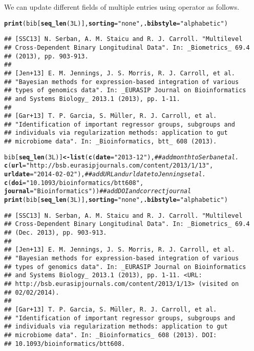 \documentclass[article]{jss}\usepackage[]{graphicx}\usepackage[]{color}
\makeatletter
\newcommand{\hlnum}[1]{\textcolor[rgb]{0.125,0.125,1}{#1}}%
\newcommand{\hlstr}[1]{\textcolor[rgb]{0.125,0.125,1}{#1}}%
\newcommand{\hlcom}[1]{\textcolor[rgb]{1,0,0.753}{\textit{#1}}}%
\newcommand{\hlstd}[1]{\textcolor[rgb]{0.251,0.251,0.282}{#1}}%
\newcommand{\hlkwb}[1]{\textcolor[rgb]{0.439,0.251,1}{\textbf{#1}}}%
\newcommand{\hlkwc}[1]{\textcolor[rgb]{0.529,0,0.184}{\textbf{#1}}}%
\newcommand{\hlkwd}[1]{\textcolor[rgb]{0.251,0.251,0.282}{\textbf{#1}}}%
\newenvironment{kframe}{%
 \def\at@end@of@kframe{}%
 \ifinner\ifhmode%
  \def\at@end@of@kframe{\end{minipage}}%
  \begin{minipage}{\columnwidth}%
 \fi\fi%
 \def\FrameCommand##1{\hskip\@totalleftmargin \hskip-\fboxsep
 \colorbox{shadecolor}{##1}\hskip-\fboxsep
     \hskip-\linewidth \hskip-\@totalleftmargin \hskip\columnwidth}%
 \MakeFramed {\advance\hsize-\width
   \@totalleftmargin\z@ \linewidth\hsize
   \@setminipage}}%
 {\par\unskip\endMakeFramed%
 \at@end@of@kframe}
\newenvironment{knitrout}{}{} %
\makeatother
\begin{document}
We can update different fields of multiple entries using operator \code{[<-} as follows.
\begin{knitrout}
\color{fgcolor}\begin{kframe}
\begin{alltt}
\hlkwd{print}\hlstd{(bib[}\hlkwd{seq_len}\hlstd{(}\hlnum{3L}\hlstd{)],} \hlkwc{sorting} \hlstd{=} \hlstr{"none"}\hlstd{,} \hlkwc{.bibstyle} \hlstd{=} \hlstr{"alphabetic"}\hlstd{)}
\end{alltt}
\begin{verbatim}
## [SSC13] N. Serban, A. M. Staicu and R. J. Carroll. "Multilevel
## Cross-Dependent Binary Longitudinal Data". In: _Biometrics_ 69.4
## (2013), pp. 903-913.
## 
## [Jen+13] E. M. Jennings, J. S. Morris, R. J. Carroll, et al.
## "Bayesian methods for expression-based integration of various
## types of genomics data". In: _EURASIP Journal on Bioinformatics
## and Systems Biology_ 2013.1 (2013), pp. 1-11.
## 
## [Gar+13] T. P. Garcia, S. Müller, R. J. Carroll, et al.
## "Identification of important regressor groups, subgroups and
## individuals via regularization methods: application to gut
## microbiome data". In: _Bioinformatics, btt_ 608 (2013).
\end{verbatim}
\begin{alltt}
\hlstd{bib[}\hlkwd{seq_len}\hlstd{(}\hlnum{3L}\hlstd{)]} \hlkwb{<-} \hlkwd{list}\hlstd{(}\hlkwd{c}\hlstd{(}\hlkwc{date}\hlstd{=}\hlstr{"2013-12"}\hlstd{),} \hlcom{## add month to Serban et al.}
        \hlkwd{c}\hlstd{(}\hlkwc{url}\hlstd{=}\hlstr{"http://bsb.eurasipjournals.com/content/2013/1/13"}\hlstd{,}
          \hlkwc{urldate} \hlstd{=} \hlstr{"2014-02-02"}\hlstd{),} \hlcom{## add URL and urldate to Jennings et al.}
        \hlkwd{c}\hlstd{(}\hlkwc{doi}\hlstd{=}\hlstr{"10.1093/bioinformatics/btt608"}\hlstd{,}
          \hlkwc{journal} \hlstd{=} \hlstr{"Bioinformatics"}\hlstd{))} \hlcom{## add DOI and correct journal}
\hlkwd{print}\hlstd{(bib[}\hlkwd{seq_len}\hlstd{(}\hlnum{3L}\hlstd{)],} \hlkwc{sorting} \hlstd{=} \hlstr{"none"}\hlstd{,} \hlkwc{.bibstyle} \hlstd{=} \hlstr{"alphabetic"}\hlstd{)}
\end{alltt}
\begin{verbatim}
## [SSC13] N. Serban, A. M. Staicu and R. J. Carroll. "Multilevel
## Cross-Dependent Binary Longitudinal Data". In: _Biometrics_ 69.4
## (Dec. 2013), pp. 903-913.
## 
## [Jen+13] E. M. Jennings, J. S. Morris, R. J. Carroll, et al.
## "Bayesian methods for expression-based integration of various
## types of genomics data". In: _EURASIP Journal on Bioinformatics
## and Systems Biology_ 2013.1 (2013), pp. 1-11. <URL:
## http://bsb.eurasipjournals.com/content/2013/1/13> (visited on
## 02/02/2014).
## 
## [Gar+13] T. P. Garcia, S. Müller, R. J. Carroll, et al.
## "Identification of important regressor groups, subgroups and
## individuals via regularization methods: application to gut
## microbiome data". In: _Bioinformatics_ 608 (2013). DOI:
## 10.1093/bioinformatics/btt608.
\end{verbatim}
\end{kframe}
\end{knitrout}
\end{document}
